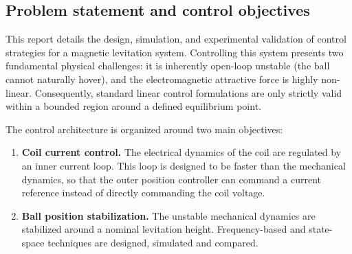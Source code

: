 \subsection{Problem statement and control objectives}
This report details the design, simulation, and experimental validation of control strategies for a magnetic levitation system.
Controlling this system presents two fundamental physical challenges: it is inherently open-loop unstable (the ball cannot naturally hover),
and the electromagnetic attractive force is highly non-linear.
Consequently, standard linear control formulations are only strictly valid within a bounded region around a defined equilibrium point. 

The control architecture is organized around two main objectives:

\begin{enumerate}[label=\textbf{O\arabic*.},leftmargin=1.4cm]
    \item \textbf{Coil current control.} The electrical dynamics of the coil are regulated by an inner current loop.
    This loop is designed to be faster than the mechanical dynamics, so that the outer position controller can command a current reference instead of directly commanding the coil voltage.
    \item \textbf{Ball position stabilization.} The unstable mechanical dynamics are stabilized around a nominal levitation height. Frequency-based and state-space techniques are designed, simulated and compared.
\end{enumerate}
